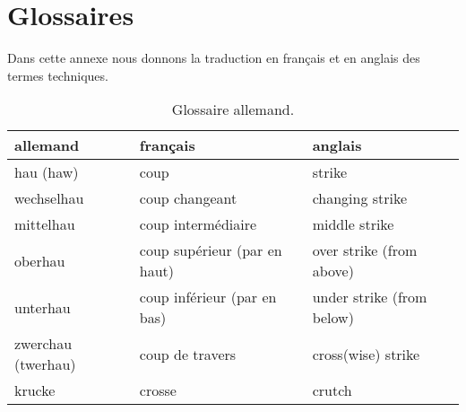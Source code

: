 \chapter{Glossaires}


Dans cette annexe nous donnons la traduction en français et en anglais des termes techniques.





\begin{table}[h]
	\centering
	\begin{tabular}{lll}
		allemand &
			français &
			anglais
			\\
		\hline
		hau (haw) &
			coup &
			strike
			\\
		wechselhau &
			coup changeant &
			changing strike
			\\
		mittelhau &
			coup intermédiaire &
			middle strike
			\\
		oberhau &
			coup supérieur (par en haut) &
			over strike (from above)
			\\
		unterhau &
			coup inférieur (par en bas) &
			under strike (from below)
			\\
		zwerchau (twerhau) &
			coup de travers &
			cross(wise) strike
			\\
		krucke &
			crosse &
			crutch
	\end{tabular}
	\caption{Glossaire allemand.}
	\label{app:tab:glossaire-allemand}
\end{table}

